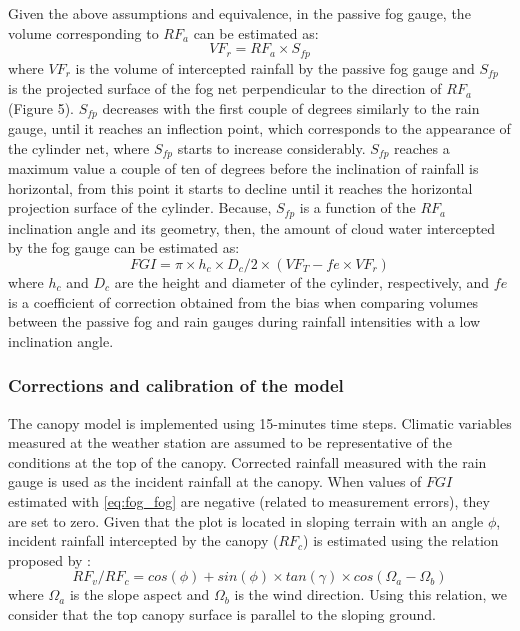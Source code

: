 \documentclass[a4paper,12pt]{article}
\begin{document}
Given the above assumptions and equivalence, in the passive fog gauge, the volume corresponding to $RF_a$ can be estimated as:
 \begin{equation} \label{eq:fog_vol1}
    VF_r = RF_a \times S_{fp}
\end{equation}
where $VF_r$ is the volume of intercepted rainfall by the passive fog gauge and $S_{fp}$ is the projected surface of the fog net perpendicular to the direction of $RF_a$ (Figure 5). $S_{fp}$ decreases with the first couple of degrees similarly to the rain gauge, until it reaches an inflection point, which corresponds to the appearance of the cylinder net, where $S_{fp}$ starts to increase considerably. $S_{fp}$ reaches a maximum value a couple of ten of degrees before the inclination of rainfall is horizontal, from this point it starts to decline until it reaches the horizontal projection surface of the cylinder. Because, $S_{fp}$ is a function of the $RF_a$ inclination angle and its geometry, then, the amount of cloud water intercepted by the fog gauge can be estimated as:
 \begin{equation} \label{eq:fog_fog}
    FGI = \pi \times h_c \times D_c/2 \times (VF_T - fe \times VF_r)
\end{equation}
where $h_c$ and $D_c$ are the height and diameter of the cylinder, respectively, and $fe$ is a coefficient of correction obtained from the bias when comparing volumes between the passive fog and rain gauges during rainfall intensities with a low inclination angle.


\subsubsection{Corrections and calibration of the model}
The canopy model is implemented using 15-minutes time steps. Climatic variables measured at the weather station are assumed to be representative of the conditions at the top of the canopy. Corrected rainfall measured with the rain gauge is used as the incident rainfall at the canopy. When values of $FGI$ estimated with \autoref{eq:fog_fog} are negative (related to measurement errors), they are set to zero. Given that the plot is located in sloping terrain with an angle $\phi$, incident rainfall intercepted by the canopy ($RF_c$) is estimated using the relation proposed by \cite{Sharon1980}:
\begin{equation} \label{eq:fog_coef}
RF_v/RF_c = cos(\phi) + sin(\phi) \times tan(\gamma) \times cos(\Omega_a - \Omega_b) 
\end{equation}
where $\Omega_a$ is the slope aspect and $ \Omega_b$ is the wind direction. Using this relation, we consider that the top canopy surface is parallel to the sloping ground. 
  
\end{document}
